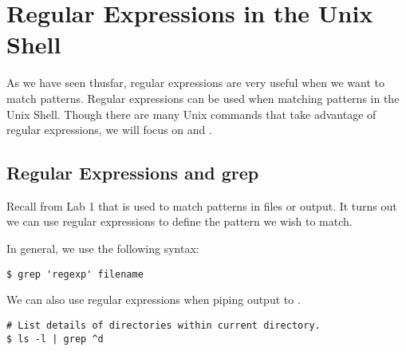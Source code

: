 \begin{comment}
Instead, use your previously defined regular expressions to make this easier. For example, either of the two following idioms will work:
\begin{lstlisting}
>>> key_1 = "basic"
>>> print ("This is a " + key_1 + " way to concatenate strings.")
This is a basic way to concatenate strings.
>>> format_dict = {"key_1": "basic", "key_2": "much more", "key_3": "advanced"}
>>> print ("This is a {key_2} {key_3} way to concatenate strings. It's {key_2} flexible.".format(**format_dict))
This is a much more advanced way to concatenate strings. It's much more flexible.
\end{lstlisting}
Keep in mind that you'll have to remove the line anchors from your previously defined regular expressions.

For reference, I used about ten lines to define \li{function_pattern_string} and used statements of the form \li{intermediate_pattern_string = r"(my regular expression here)".format()} four times.
\end{warn}

\label{prob:match_function_definition}
\end{problem*}
\end{comment}

\section*{Regular Expressions in the Unix Shell}
As we have seen thusfar, regular expressions are very useful when we want to match patterns. Regular expressions can be used when matching patterns in the Unix Shell. Though there are many Unix commands that take advantage of regular expressions, we will focus on  and .

\subsection*{Regular Expressions and grep}
Recall from Lab 1 that  is used to match patterns in files or output. It turns out we can use regular expressions to define the pattern we wish to match.

In general, we use the following syntax:
\begin{lstlisting}
$ grep 'regexp' filename
\end{lstlisting}

We can also use regular expressions when piping output to .
\begin{lstlisting}
# List details of directories within current directory.
$ ls -l | grep ^d
\end{lstlisting}


